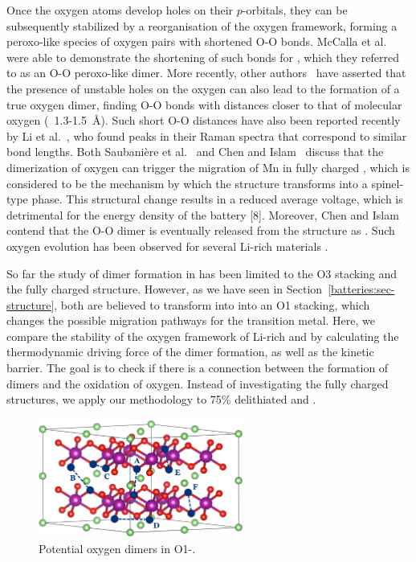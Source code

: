 \begin{refsection}
Once the oxygen atoms develop holes on their $p$-orbitals, they can be 
subsequently stabilized by a reorganisation of the oxygen framework, forming a 
peroxo-like species of oxygen pairs with shortened O-O bonds. McCalla et 
al.~\cite{McCalla2015} were able to demonstrate the shortening of such bonds 
for , which they referred to as an O-O peroxo-like dimer. More 
recently, other authors~\cite{Saubanere2016, Chen2016} have asserted that the 
presence of unstable holes on the oxygen can also lead to the formation of a 
true oxygen dimer, finding O-O bonds with distances closer to that of 
molecular oxygen (~1.3-1.5~\si{\angstrom}). Such short O-O distances have also 
been reported recently by Li et al.~\cite{Li2018}, who found peaks in their 
Raman spectra that correspond to similar bond lengths. Both Saubani\`ere et 
al.~\cite{Saubanere2016} and Chen and Islam~\cite{Chen2016} discuss that the 
dimerization of oxygen can trigger the migration of Mn in fully charged 
, which is considered to be the mechanism by which the structure 
transforms into a spinel-type phase. This structural change results in a 
reduced average voltage, which is detrimental for the energy density of the 
battery [8]. Moreover, Chen and Islam contend that the O-O dimer is eventually 
released from the structure as . Such oxygen evolution has been 
observed for several Li-rich materials \cite{Armstrong2006, Luo2016}.  
 
So far the study of dimer formation in  has been limited to the O3 
stacking and the fully charged structure. However, as we have seen in 
Section~\ref{batteries:sec-structure}, both   are 
believed to transform into into an O1 stacking, which changes the possible 
migration pathways for the transition metal. Here, we compare the stability of 
the oxygen framework of Li-rich  and  by calculating 
the thermodynamic driving force of the dimer formation, as well as the kinetic 
barrier. The goal is to check if there is a connection between the formation 
of dimers and the oxidation of oxygen. Instead of investigating the fully 
charged structures, we apply our methodology to 75\% delithiated 
 and .  
 
\begin{figure}[ht]
\centering 
\captionsetup{width=0.9\linewidth}
\includegraphics[width=0.6\textwidth]{Figures/batteries/oxygen_dimers.png} 
\caption{Potential oxygen dimers in O1-.} 
\label{batteries:fig-oxygen_dimers}  
\end{figure} 
 

\end{refsection}
